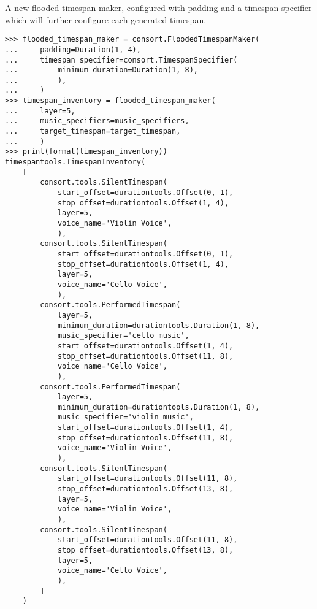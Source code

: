 A new flooded timespan maker, configured with padding and a timespan specifier
which will further configure each generated timespan.

\begin{comment}
<abjad>
flooded_timespan_maker = consort.FloodedTimespanMaker(
    padding=Duration(1, 4),
    timespan_specifier=consort.TimespanSpecifier(
        minimum_duration=Duration(1, 8),
        ),
    )
timespan_inventory = flooded_timespan_maker(
    layer=5,
    music_specifiers=music_specifiers,
    target_timespan=target_timespan,
    )
print(format(timespan_inventory))
</abjad>
\end{comment}

\begin{singlespacing}
\vspace{-0.5\baselineskip}
\begin{lstlisting}
>>> flooded_timespan_maker = consort.FloodedTimespanMaker(
...     padding=Duration(1, 4),
...     timespan_specifier=consort.TimespanSpecifier(
...         minimum_duration=Duration(1, 8),
...         ),
...     )
>>> timespan_inventory = flooded_timespan_maker(
...     layer=5,
...     music_specifiers=music_specifiers,
...     target_timespan=target_timespan,
...     )
>>> print(format(timespan_inventory))
timespantools.TimespanInventory(
    [
        consort.tools.SilentTimespan(
            start_offset=durationtools.Offset(0, 1),
            stop_offset=durationtools.Offset(1, 4),
            layer=5,
            voice_name='Violin Voice',
            ),
        consort.tools.SilentTimespan(
            start_offset=durationtools.Offset(0, 1),
            stop_offset=durationtools.Offset(1, 4),
            layer=5,
            voice_name='Cello Voice',
            ),
        consort.tools.PerformedTimespan(
            layer=5,
            minimum_duration=durationtools.Duration(1, 8),
            music_specifier='cello music',
            start_offset=durationtools.Offset(1, 4),
            stop_offset=durationtools.Offset(11, 8),
            voice_name='Cello Voice',
            ),
        consort.tools.PerformedTimespan(
            layer=5,
            minimum_duration=durationtools.Duration(1, 8),
            music_specifier='violin music',
            start_offset=durationtools.Offset(1, 4),
            stop_offset=durationtools.Offset(11, 8),
            voice_name='Violin Voice',
            ),
        consort.tools.SilentTimespan(
            start_offset=durationtools.Offset(11, 8),
            stop_offset=durationtools.Offset(13, 8),
            layer=5,
            voice_name='Violin Voice',
            ),
        consort.tools.SilentTimespan(
            start_offset=durationtools.Offset(11, 8),
            stop_offset=durationtools.Offset(13, 8),
            layer=5,
            voice_name='Cello Voice',
            ),
        ]
    )
\end{lstlisting}
\end{singlespacing}

